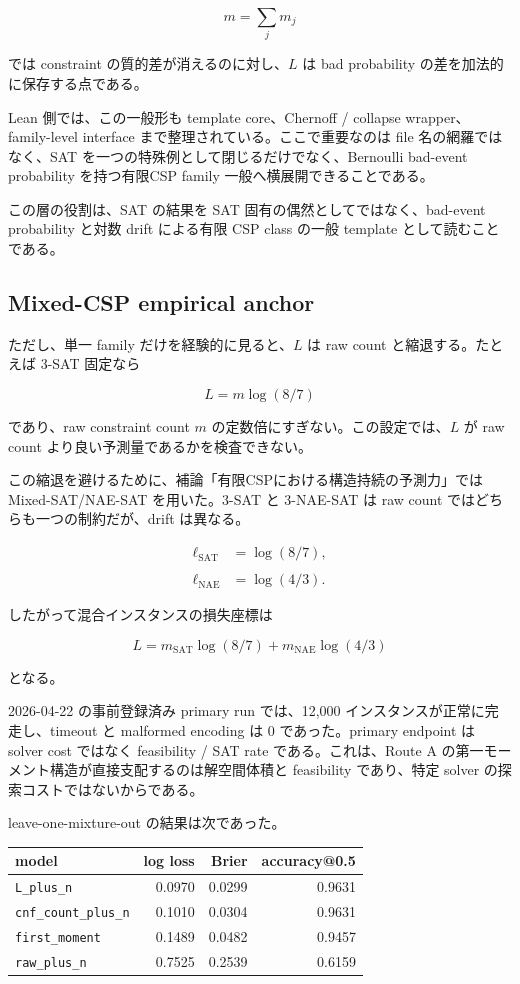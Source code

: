 \documentclass[12pt,a4paper]{article}
\begin{document}
\[
m=\sum_{j} m_{j}
\]

では constraint の質的差が消えるのに対し、\(L\) は bad probability の差を加法的に保存する点である。

Lean 側では、この一般形も template core、Chernoff / collapse wrapper、family-level interface まで整理されている。ここで重要なのは file 名の網羅ではなく、SAT を一つの特殊例として閉じるだけでなく、Bernoulli bad-event probability を持つ有限CSP family 一般へ横展開できることである。

この層の役割は、SAT の結果を SAT 固有の偶然としてではなく、bad-event probability と対数 drift による有限 CSP class の一般 template として読むことである。

\subsection{Mixed-CSP empirical anchor}\label{mixed-csp-empirical-anchor}

ただし、単一 family だけを経験的に見ると、\(L\) は raw count と縮退する。たとえば 3-SAT 固定なら

\[
L=m\log(8/7)
\]

であり、raw constraint count \(m\) の定数倍にすぎない。この設定では、\(L\) が raw count より良い予測量であるかを検査できない。

この縮退を避けるために、補論「有限CSPにおける構造持続の予測力」では Mixed-SAT/NAE-SAT を用いた。3-SAT と 3-NAE-SAT は raw count ではどちらも一つの制約だが、drift は異なる。

\[
\begin{aligned}
\ell_{\mathrm{SAT}}&=\log(8/7), \\
\qquad \\
\ell_{\mathrm{NAE}}&=\log(4/3).
\end{aligned}
\]

したがって混合インスタンスの損失座標は

\[
L = m_{\mathrm{SAT}}\log(8/7) + m_{\mathrm{NAE}}\log(4/3)
\]

となる。

2026-04-22 の事前登録済み primary run では、12,000 インスタンスが正常に完走し、timeout と malformed encoding は 0 であった。primary endpoint は solver cost ではなく feasibility / SAT rate である。これは、Route A の第一モーメント構造が直接支配するのは解空間体積と feasibility であり、特定 solver の探索コストではないからである。

leave-one-mixture-out の結果は次であった。

{\def\LTcaptype{table} %
\begin{longtable}[]{@{}lrrr@{}}
\toprule\noalign{}
model & log loss & Brier & accuracy@0.5 \\
\midrule\noalign{}
\endhead
\bottomrule\noalign{}
\endlastfoot
\texttt{L\_plus\_n} & 0.0970 & 0.0299 & 0.9631 \\
\texttt{cnf\_count\_plus\_n} & 0.1010 & 0.0304 & 0.9631 \\
\texttt{first\_moment} & 0.1489 & 0.0482 & 0.9457 \\
\texttt{raw\_plus\_n} & 0.7525 & 0.2539 & 0.6159 \\
\end{longtable}
}
\end{document}
